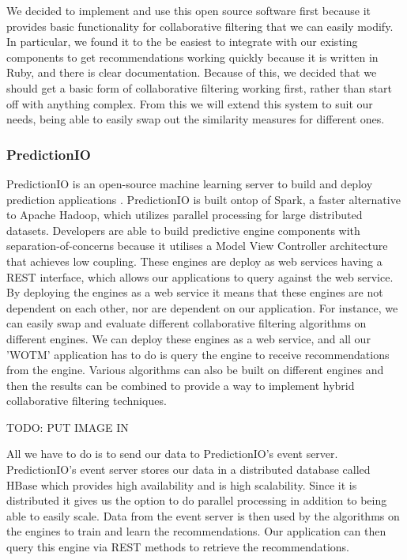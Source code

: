 We decided to implement and use this open source software first because it provides basic functionality for collaborative filtering that we can easily modify. In particular, we found it to the be easiest to integrate with our existing components to get recommendations working quickly because it is written in Ruby, and there is clear documentation. Because of this, we decided that we should get a basic form of collaborative filtering working first, rather than start off with anything complex. From this we will extend this system to suit our needs, being able to easily swap out the similarity measures for different ones. 

\subsubsection{PredictionIO}

PredictionIO is an open-source machine learning server to build and deploy prediction applications \cite{predictionio, predictionio2}. PredictionIO is built ontop of Spark, a faster alternative to Apache Hadoop, which utilizes parallel processing for large distributed datasets. Developers are able to build predictive engine components with separation-of-concerns because it utilises a Model View Controller architecture that achieves low coupling. These engines are deploy as web services having a REST interface, which allows our applications to query against the web service. By deploying the engines as a web service it means that these engines are not dependent on each other, nor are dependent on our application. For instance, we can easily swap and evaluate different collaborative filtering algorithms on different engines. We can deploy these engines as a web service, and all our 'WOTM' application has to do is query the engine to receive recommendations from the engine. Various algorithms can also be built on different engines and then the results can be combined to provide a way to implement hybrid collaborative filtering techniques. 

TODO: PUT IMAGE IN 

All we have to do is to send our data to PredictionIO's event server. PredictionIO's event server stores our data in a distributed database called HBase which provides high availability and is high scalability. Since it is distributed it gives us the option to do parallel processing in addition to being able to easily scale. Data from the event server is then used by the algorithms on the engines to train and learn the recommendations. Our application can then query this engine via REST methods to retrieve the recommendations. 


